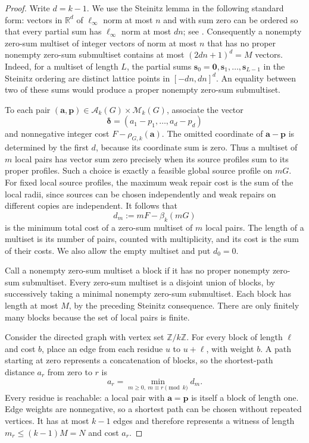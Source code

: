 \documentclass[11pt,reqno]{amsart}
\numberwithin{equation}{section}
\theoremstyle{definition}
\theoremstyle{remark}
\begin{document}
\begin{proof}
Write $d=k-1$. We use the Steinitz lemma in the following standard
form: vectors in $\mathbb R^d$ of $\ell_\infty$ norm at most $n$
and with sum zero can be ordered so that every partial sum has
$\ell_\infty$ norm at most $dn$; see \cite{eisenbrandweismantel2018}.
Consequently a nonempty zero-sum multiset of integer vectors of norm
at most $n$ that has no proper nonempty zero-sum submultiset contains
at most $(2dn+1)^d=M$ vectors. Indeed, for a multiset of length $L$,
the partial sums $\mathbf s_0=\mathbf0,\mathbf s_1,\ldots,\mathbf s_{L-1}$
in the Steinitz ordering
are distinct lattice points in $[-dn,dn]^d$.
An equality between two of these sums would produce
a proper nonempty zero-sum submultiset.

To each pair
$(\mathbf a,\mathbf p)\in\mathcal A_k(G)\times\mathcal M_k(G)$,
associate the vector
\[
 \boldsymbol\delta=(a_1-p_1,\ldots,a_d-p_d)
\]
and nonnegative integer cost $F-\rho_{G,k}(\mathbf a)$.
The omitted coordinate of $\mathbf a-\mathbf p$ is determined by
the first $d$, because its coordinate sum is zero.
Thus a multiset of $m$ local pairs has vector sum zero precisely
when its source profiles sum to its proper profiles. Such a choice
is exactly a feasible global source profile on $mG$.
For fixed local source profiles, the maximum weak repair cost is
the sum of the local radii, since sources can be chosen independently
and weak repairs on different copies are independent. It follows that
\[
 d_m:=mF-\beta_k(mG)
\]
is the minimum total cost of a zero-sum multiset of $m$ local pairs.
The length of a multiset is its number of pairs, counted with
multiplicity, and its cost is the sum of their costs.
We also allow the empty multiset and put $d_0=0$.

Call a nonempty zero-sum multiset a block if it has no proper
nonempty zero-sum submultiset. Every zero-sum multiset is a disjoint
union of blocks, by successively taking a minimal nonempty zero-sum
submultiset. Each block has length at most $M$, by the preceding
Steinitz consequence. There are only finitely many blocks because
the set of local pairs is finite.

Consider the directed graph with vertex set $\mathbb Z/k\mathbb Z$.
For every block of length $\ell$ and cost $b$, place an edge from
each residue $u$ to $u+\ell$, with weight $b$.
A path starting at zero represents a concatenation of blocks, so
the shortest-path distance $a_r$ from zero to $r$ is
\[
 a_r=\min_{m\ge0,\ m\equiv r\pmod k}d_m.
\]
Every residue is reachable: a local pair with $\mathbf a=\mathbf p$
is itself a block of length one. Edge weights are nonnegative, so
a shortest path can be chosen without repeated vertices. It has
at most $k-1$ edges and therefore represents a witness of length
$m_r\le(k-1)M=N$ and cost $a_r$.


\end{proof}
\end{document}
